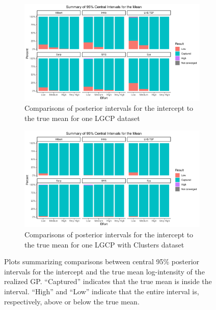 \documentclass[review]{elsarticle}
\begin{document}
\begin{figure}

\begin{subfigure}{5in}
\includegraphics[width=5in]{../graphics/IntCapture-LGCP000004.png}
\caption{Comparisons of posterior intervals for the intercept to the true mean
for one LGCP dataset}
\label{intlgcp}
\end{subfigure}

\begin{subfigure}{5in}
\includegraphics[width=5in]{../graphics/IntCapture-Cluster000004.png}
\caption{Comparisons of posterior intervals for the intercept to the true mean
for one LGCP with Clusters dataset}
\label{intclust}
\end{subfigure}

\caption{Plots summarizing comparisons between central 95\% posterior intervals
for the intercept and the true mean log-intensity of the realized GP.
``Captured'' indicates that the true mean is inside the interval. ``High'' and
``Low'' indicate that the entire interval is, respectively, above or below the
true mean.}
\label{intresults}
\end{figure}
\end{document}
